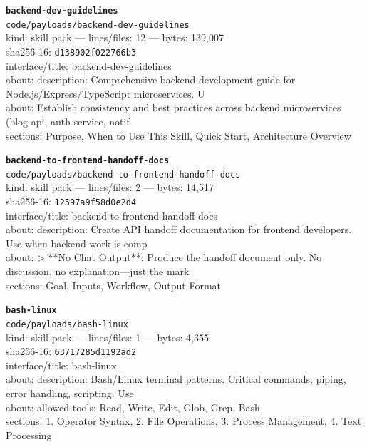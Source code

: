 \noindent\textbf{\texttt{backend-dev-guidelines}}\\
\texttt{code/payloads/backend-dev-guidelines}\\
kind: skill pack --- lines/files: 12 --- bytes: 139,007\\
sha256-16: \texttt{d138902f022766b3}\\
interface/title: backend-dev-guidelines\\
about: description: Comprehensive backend development guide for Node.js/Express/TypeScript microservices. U\\
about: Establish consistency and best practices across backend microservices (blog-api, auth-service, notif\\
sections: Purpose, When to Use This Skill, Quick Start, Architecture Overview\\
\vspace*{6.0pt}
\newpage

\noindent\textbf{\texttt{backend-to-frontend-handoff-docs}}\\
\texttt{code/payloads/backend-to-frontend-handoff-docs}\\
kind: skill pack --- lines/files: 2 --- bytes: 14,517\\
sha256-16: \texttt{12597a9f58d0e2d4}\\
interface/title: backend-to-frontend-handoff-docs\\
about: description: Create API handoff documentation for frontend developers. Use when backend work is comp\\
about: > **No Chat Output**: Produce the handoff document only. No discussion, no explanation—just the mark\\
sections: Goal, Inputs, Workflow, Output Format\\
\vspace*{6.0pt}

\noindent\textbf{\texttt{bash-linux}}\\
\texttt{code/payloads/bash-linux}\\
kind: skill pack --- lines/files: 1 --- bytes: 4,355\\
sha256-16: \texttt{63717285d1192ad2}\\
interface/title: bash-linux\\
about: description: Bash/Linux terminal patterns. Critical commands, piping, error handling, scripting. Use\\
about: allowed-tools: Read, Write, Edit, Glob, Grep, Bash\\
sections: 1. Operator Syntax, 2. File Operations, 3. Process Management, 4. Text Processing\\
\vspace*{6.0pt}

